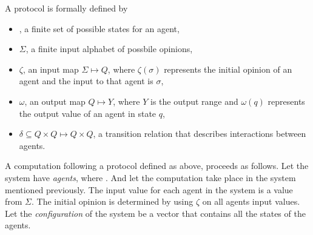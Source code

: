  A protocol is formally defined by
 \begin{itemize}
     \item {}, a finite set of possible states for an agent,
     \item $\Sigma$, a finite input alphabet of possbile opinions,
     \item $\zeta$, an input map $\Sigma \mapsto Q$, where $\zeta(\sigma)$ represents the initial opinion of an agent and the input to that agent is $\sigma$,
     \item $\omega$, an output map $Q \mapsto Y$, where $Y$ is the output range and $\omega(q)$ represents the output value of an agent in state $q$,
     \item $\delta \subseteq Q \times Q \mapsto Q \times Q$, a transition relation that describes interactions between agents.
 \end{itemize}

A computation following a protocol defined as above, proceeds as follows. Let the system have  \emph{agents}, where . And let the computation take place in the system mentioned previously. The input value for each agent in the system is a value from $\Sigma$. The initial opinion is determined by using $\zeta$ on all agents input values. Let the \emph{configuration} of the system be a vector  that contains all the states of the agents. 


